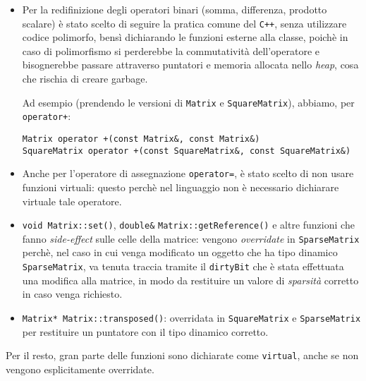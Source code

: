 \begin{itemize}
    \item Per la redifinizione degli operatori binari (somma, differenza, prodotto scalare) è stato scelto di seguire la 
    pratica comune del \texttt{C++}, senza utilizzare codice polimorfo, bensì dichiarando le funzioni esterne alla 
    classe, poichè in caso di polimorfismo si perderebbe la commutatività dell'operatore e bisognerebbe passare 
    attraverso puntatori e memoria allocata nello \emph{heap}, cosa che rischia di creare garbage.\par 
    Ad esempio (prendendo le versioni di \texttt{Matrix} e \texttt{SquareMatrix}), abbiamo, per \texttt{operator+}:
    \begin{center}
        \texttt{Matrix operator +(const Matrix}\verb|&|\texttt{, const Matrix}\verb|&|\texttt{)} \\
        \texttt{SquareMatrix operator +(const SquareMatrix}\verb|&|\texttt{, const SquareMatrix}\verb|&|\texttt{)}
    \end{center}
    
    \item Anche per l'operatore di assegnazione \texttt{operator=}, è stato scelto di non usare funzioni virtuali:
    questo perchè nel linguaggio non è necessario dichiarare virtuale tale operatore.

    \item \texttt{void Matrix::set()}, \texttt{double}\verb|&| \texttt{Matrix::getReference()} e altre funzioni che fanno \emph{side-effect}
    sulle celle della matrice: vengono \emph{overridate} in \texttt{SparseMatrix} perchè, nel caso in cui 
    venga modificato un oggetto che ha tipo dinamico \texttt{SparseMatrix},
    va tenuta traccia tramite il \texttt{dirtyBit} che è stata effettuata una modifica alla matrice, in modo
    da restituire un valore di \emph{sparsità} corretto in caso venga richiesto.

    \item \texttt{Matrix* Matrix::transposed()}: overridata in \texttt{SquareMatrix} e \texttt{SparseMatrix} 
    per restituire un puntatore con il tipo dinamico corretto. 
\end{itemize}
Per il resto, gran parte delle funzioni sono dichiarate come \texttt{virtual}, anche se non vengono esplicitamente overridate.

